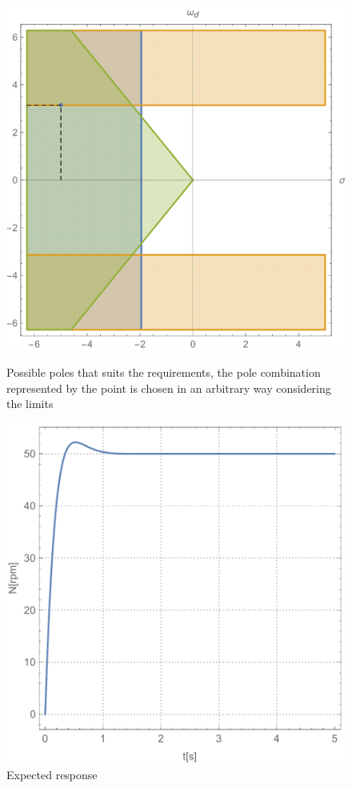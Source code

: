 \documentclass[12pt,english,twoside]{article}
\begin{document}
\begin{figure}[htb!]
	\centering
	\centering
	\includegraphics[width=\textwidth]{figures/polemap_at_50}
	\caption{Possible poles that suits the requirements, the pole combination represented by the point is chosen in an arbitrary way considering the limits}
	\label{polemap_at_50}
	\endminipage\hfill
	\centering
	\includegraphics[width=\textwidth]{figures/expected_50}
	\caption{Expected response}
	\label{expected_response_50}
	\endminipage\hfill
\end{figure}
\end{document}
